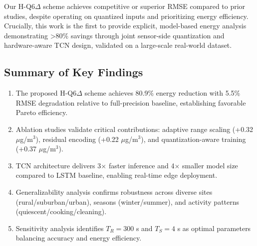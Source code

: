 Our H-Q6$\Delta$ scheme achieves competitive or superior RMSE compared to prior studies, despite operating on quantized inputs and prioritizing energy efficiency. Crucially, this work is the first to provide explicit, model-based energy analysis demonstrating >80\% savings through joint sensor-side quantization and hardware-aware TCN design, validated on a large-scale real-world dataset.

\subsection{Summary of Key Findings}

\begin{enumerate}
\item The proposed H-Q6$\Delta$ scheme achieves 80.9\% energy reduction with 5.5\% RMSE degradation relative to full-precision baseline, establishing favorable Pareto efficiency.

\item Ablation studies validate critical contributions: adaptive range scaling (+0.32 $\mu$g/m$^3$), residual encoding (+0.22 $\mu$g/m$^3$), and quantization-aware training (+0.37 $\mu$g/m$^3$).

\item TCN architecture delivers 3$\times$ faster inference and 4$\times$ smaller model size compared to LSTM baseline, enabling real-time edge deployment.

\item Generalizability analysis confirms robustness across diverse sites (rural/suburban/urban), seasons (winter/summer), and activity patterns (quiescent/cooking/cleaning).

\item Sensitivity analysis identifies $T_R = 300$ s and $T_S = 4$ s as optimal parameters balancing accuracy and energy efficiency.
\end{enumerate}